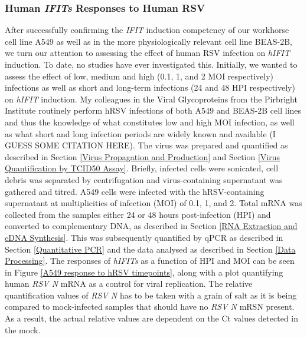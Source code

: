 \subsubsection{Human \textit{IFITs} Responses to Human RSV} \label{Human \textit{IFITs} Responses to Human RSV}
After successfully confirming the \textit{IFIT} induction competency of  our workhorse cell line A549 as well as in the more physiologically relevant cell line BEAS-2B, we turn our attention to assessing the effect of human RSV infection on \textit{hIFIT} induction. To date, no studies have ever investigated this. Initially, we wanted to assess the effect of low, medium and high (0.1, 1, and 2 MOI respectively) infections as well as short and long-term infections (24 and 48 HPI respectively) on \textit{hIFIT} induction. My colleagues in the Viral Glycoproteins from the Pirbright Institute routinely perform hRSV infections of both A549 and BEAS-2B cell lines and thus the knowledge of what constitutes low and high MOI infection, as well as what short and long infection periods are widely known and available (I GUESS SOME CITATION HERE).  The virus was prepared and quantified as described in Section \ref{Virus Propagation and Production} and Section \ref{Virus Quantification by TCID50 Assay}. Briefly, infected cells were sonicated, cell debris was separated by centrifugation and virus-containing supernatant was gathered and titred. A549 cells were infected with the hRSV-containing supernatant at multiplicities of infection (MOI) of 0.1, 1,  and 2. Total mRNA was collected from the samples either 24 or 48 hours post-infection (HPI) and converted to complementary DNA, as described in Section \ref{RNA Extraction and cDNA Synthesis}. This was subsequently quantified by qPCR as described in Section \ref{Quantitative PCR} and the data analysed as described in Section \ref{Data Processing}. The responses of \textit{hIFITs} as a function of HPI and MOI can be seen in Figure \ref{A549 response to hRSV timepoints}, along with a plot quantifying human \textit{RSV N} mRNA as a control for viral replication. The relative quantification values of \textit{RSV N} has to be taken with a grain of salt as it is being compared to mock-infected samples that should have no \textit{RSV N} mRSN present. As a result, the actual relative values are dependent on the Ct values detected in the mock. 
 

